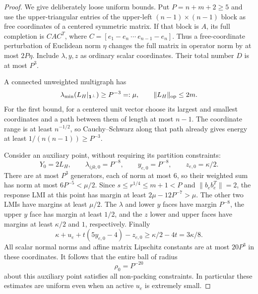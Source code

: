 \begin{proof}
We give deliberately loose uniform bounds. Put $P=n+m+2\ge5$ and use
the upper-triangular entries of the upper-left $(n-1)\times(n-1)$ block
as free coordinates of a centered symmetric matrix. If that block is
$A$, its full completion is $CAC^T$, where
$C=[e_1-e_n\ \cdots\ e_{n-1}-e_n]$. Thus a free-coordinate perturbation
of Euclidean norm $\eta$ changes the full matrix in operator norm by at
most $2P\eta$. Include $\lambda,y,z$ as ordinary scalar coordinates.
Their total number $D$ is at most $P^3$.

A connected unweighted multigraph has
\begin{equation}
 \lambda_{\min}(L_H|_{\mathbf 1^\perp})\ge P^{-3}=:\mu,
                         \qquad \|L_H\|_{\mathrm{op}}\le2m.
 \label{eq:ta-spectral-size}
\end{equation}
For the first bound, for a centered unit vector choose its largest and
smallest coordinates and a path between them of length at most $n-1$.
The coordinate range is at least $n^{-1/2}$, so Cauchy--Schwarz along
that path already gives energy at least $1/(n(n-1))\ge P^{-3}$.

Consider an auxiliary point, without requiring its partition constraints:
\begin{equation}
 Y_0=2L_H,\qquad \lambda_{ijk,0}=P^{-8},\qquad
 y_{e,0}=P^{-8},\qquad z_{e,0}=\kappa/2.
 \label{eq:ta-auxiliary}
\end{equation}
There are at most $P^3$ generators, each of norm at most $6$, so their
weighted sum has norm at most $6P^{-5}<\mu/2$.
Since $s\le r^{1/4}\le m+1<P$ and $\|b_eb_e^T\|=2$, the response LMI
at this point has margin at least $2\mu-12P^{-7}>\mu$.
The other two LMIs have margins at least $\mu/2$.
The $\lambda$ and lower $y$ faces have margin $P^{-8}$, the upper $y$
face has margin at least $1/2$, and the $z$ lower and upper faces have
margins at least $\kappa/2$ and $1$, respectively. Finally
\[
 \kappa+u_e+t(5y_{e,0}-4)-z_{e,0}
       \ge\kappa/2-4t=3\kappa/8.
\]
All scalar normal norms and affine matrix Lipschitz constants are at
most $20P^3$ in these coordinates. It follows that the entire ball of
radius
\begin{equation}
                         \rho_0=P^{-20}
 \label{eq:ta-aux-radius}
\end{equation}
about this auxiliary point satisfies all non-packing constraints.
In particular these estimates are uniform even when an active $u_e$
is extremely small.


\end{proof}
